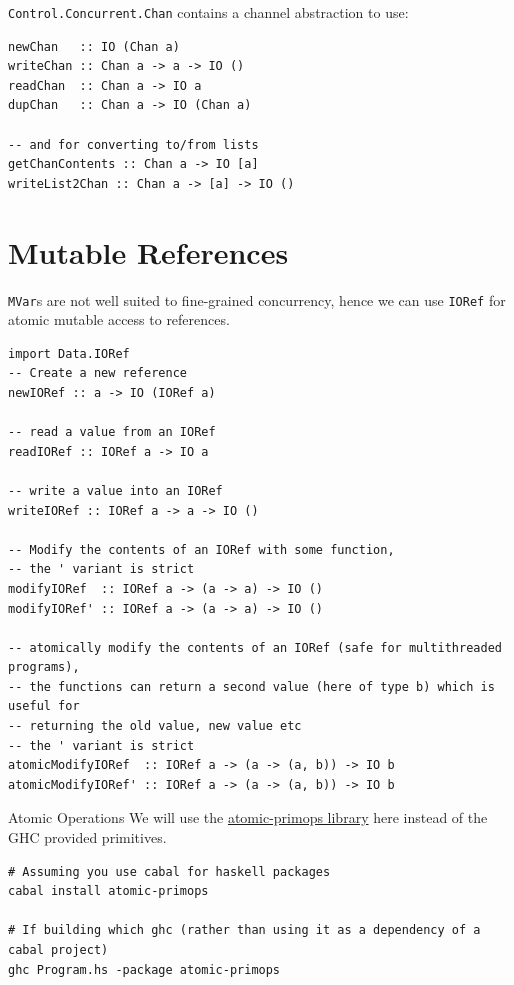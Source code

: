 \noindent \texttt{Control.Concurrent.Chan} contains a channel abstraction to use:
\begin{verbatim}
newChan   :: IO (Chan a)
writeChan :: Chan a -> a -> IO ()
readChan  :: Chan a -> IO a
dupChan   :: Chan a -> IO (Chan a)

-- and for converting to/from lists
getChanContents :: Chan a -> IO [a]
writeList2Chan :: Chan a -> [a] -> IO ()
\end{verbatim}

\section{Mutable References}
\texttt{MVar}s are not well suited to fine-grained concurrency, hence we can use \texttt{IORef} for atomic mutable access to references.
\begin{verbatim}
import Data.IORef
-- Create a new reference
newIORef :: a -> IO (IORef a)

-- read a value from an IORef
readIORef :: IORef a -> IO a

-- write a value into an IORef
writeIORef :: IORef a -> a -> IO ()

-- Modify the contents of an IORef with some function, 
-- the ' variant is strict
modifyIORef  :: IORef a -> (a -> a) -> IO ()
modifyIORef' :: IORef a -> (a -> a) -> IO ()

-- atomically modify the contents of an IORef (safe for multithreaded programs), 
-- the functions can return a second value (here of type b) which is useful for 
-- returning the old value, new value etc
-- the ' variant is strict
atomicModifyIORef  :: IORef a -> (a -> (a, b)) -> IO b
atomicModifyIORef' :: IORef a -> (a -> (a, b)) -> IO b
\end{verbatim}

\begin{sidenotebox}{Atomic Operations}
    We will use the \href{https://hackage.haskell.org/package/atomic-primops}{atomic-primops library} here instead of the GHC provided primitives.
    \begin{verbatim}
# Assuming you use cabal for haskell packages
cabal install atomic-primops

# If building which ghc (rather than using it as a dependency of a cabal project)
ghc Program.hs -package atomic-primops
    \end{verbatim}
\end{sidenotebox}

